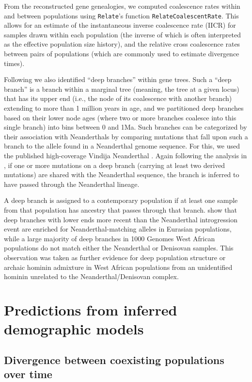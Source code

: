 \documentclass[]{article}
\begin{document}
From the reconstructed gene genealogies, we computed coalescence rates within
and between populations using \texttt{Relate}’s function \texttt{RelateCoalescentRate}.
This allows for an estimate of the instantaneous inverse coalescence rate
(IICR) for samples drawn within each population (the inverse of which is often
interpreted as the effective population size history), and the relative cross
coalescence rates between pairs of populations (which are commonly used to
estimate divergence times).

Following \citet{Speidel2019-nj} we also identified “deep branches” within gene
trees. Such a “deep branch” is a branch within a marginal tree (meaning, the
tree at a given locus) that has its upper end (i.e., the node of its
coalescence with another branch) extending to more than 1 million years in age,
and we partitioned deep branches based on their lower node ages (where two or
more branches coalesce into this single branch) into bins between 0 and 1Ma.
Such branches can be categorized by their association with Neanderthals by
comparing mutations that fall upon such a branch to the allele found in a
Neanderthal genome sequence. For this, we used the published high-coverage
Vindija Neanderthal \citep{Prufer2017-kk}. Again following the analysis in
\citet{Speidel2019-nj}, if one or more mutations on a deep branch (carrying at
least two derived mutations) are shared with the Neanderthal sequence, the
branch is inferred to have passed through the Neanderthal lineage.

A deep branch is assigned to a contemporary population if at least one sample
from that population has ancestry that passes through that branch.
\citet{Speidel2019-nj} show that deep branches with lower ends more recent than
the Neanderthal introgression event are enriched for Neanderthal-matching
alleles in Eurasian populations, while a large majority of deep branches in
1000 Genomes West African populations do not match either the Neanderthal or
Denisovan samples. This observation was taken as further evidence for deep
population structure or archaic hominin admixture in West African populations from an
unidentified hominin unrelated to the Neanderthal/Denisovan complex.

\section{Predictions from inferred demographic models}

\subsection{Divergence between coexisting populations over time}
\end{document}
